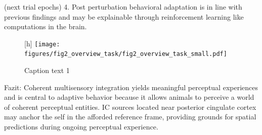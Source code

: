 (next trial epochs)
4. Post perturbation behavioral adaptation is in line with previous findings and may be explainable through reinforcement learning like computations in the brain.

\begin{figure}{\textwidth}[h]
    \centering\texttt{[image: figures/fig2\_overview\_task/fig2\_overview\_task\_small.pdf]}
    \label{task}
    \caption{Caption text 1}
\end{figure}

Fazit:
Coherent multisensory integration yields meaningful perceptual experiences and is central to adaptive behavior because it allows animals to perceive a world of coherent perceptual entities. IC sources located near posterior cingulate cortex may anchor the self in the afforded reference frame, providing grounds for spatial predictions during ongoing perceptual experience.


